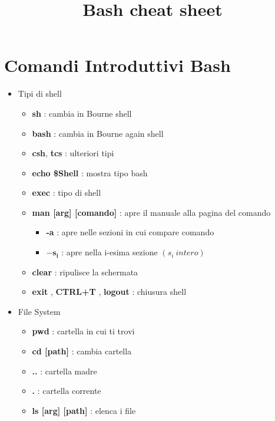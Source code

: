 \documentclass{article}
\title{Bash cheat sheet}
\begin{document}
\maketitle

\newpage

\section{Comandi Introduttivi Bash}
\begin{itemize} %

    \item Tipi di shell
    
        \begin{itemize} %
        
        \item \textbf{sh} : cambia in Bourne shell
        \item \textbf{bash} :  cambia in Bourne again shell
        \item \textbf{csh}, \textbf{tcs} : ulteriori tipi
        \item \textbf{echo \$Shell} : mostra tipo bash
        \item \textbf{exec} : tipo di shell
        \item \textbf{man [arg] [comando]} : apre il manuale alla pagina del comando
            \begin{itemize}
                \item \textbf{-a} : apre nelle sezioni in cui compare comando
                \item $\mathbf{ -s_{i} }$ : apre nella i-esima sezione $(s_{i} \ intero)$
            \end{itemize}
        \item \textbf{clear} : ripulisce la schermata
        \item \textbf{exit} , \textbf{CTRL+T} , \textbf{logout} : chiusura shell
        
        \end{itemize} %
        
    \item File System
    
        \begin{itemize} %
        
            \item \textbf{pwd } : cartella in cui ti trovi
            \item \textbf{ cd [path] } : cambia cartella
            \item \textbf{..} : cartella madre
            \item \textbf{.} : cartella corrente
            \item \textbf{ls [arg] [path] } : elenca i file
            

\end{itemize}
\end{itemize}
\end{document}
